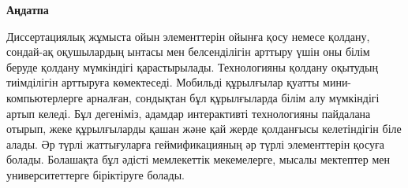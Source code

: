 \newpage
\pagestyle{plain}

{
\begin{center}
    \Large
    \textbf{Аңдатпа}
\end{center}
Диссертациялық жұмыста ойын элементтерін ойынға қосу немесе қолдану, сондай-ақ оқушылардың ынтасы мен белсенділігін арттыру үшін оны білім беруде қолдану мүмкіндігі қарастырылады. Технологияны қолдану оқытудың тиімділігін арттыруға көмектеседі. Мобильді құрылғылар қуатты мини-компьютерлерге арналған, сондықтан бұл құрылғыларда білім алу мүмкіндігі артып келеді. Бұл дегеніміз, адамдар интерактивті технологияны пайдалана отырып, жеке құрылғыларды қашан және қай жерде қолданғысы келетіндігін біле алады. Әр түрлі жаттығуларға геймификацияның әр түрлі элементтерін қосуға болады. Болашақта бұл әдісті мемлекеттік мекемелерге, мысалы мектептер мен университеттерге біріктіруге болады.
}
